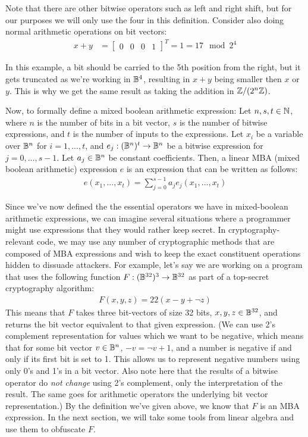 Note that there are other bitwise operators such as left and right shift, but for our
purposes we will only use the four in this definition. Consider also doing normal arithmetic operations on bit vectors:
\begin{align*}
x + y &= \begin{bmatrix}
0 & 0 & 0 & 1 
\end{bmatrix}^T = 1 = 17 \mod 2^4 
\end{align*}
\par In this example, a bit should be carried to
the 5th position from the right, but it gets truncated as we're working in $\mathbb{B}^4$, resulting
in $x + y$ being smaller then $x$ or $y$. 
This is why we get the same result as taking the addition in
$\mathbb{Z}/(2^n\mathbb{Z})$.
\par Now, to formally define a mixed boolean arithmetic expression:
 {Let $n,s,t \in \mathbb{N}$, where $n$ is the number of bits in a bit vector, 
$s$ is the number of bitwise expressions, and $t$ is the number of 
inputs to the expressions.
Let $x_i$ be a variable over $\mathbb{B}^n$ for
$i = 1,...,t$, and $e_j : (\mathbb{B}^n)^t \rightarrow \mathbb{B}^n$ be a bitwise expression for
$j = 0,...,s-1$. Let $a_j\in \mathbb{B}^n$ be constant coefficients.
Then, a linear MBA (mixed boolean arithmetic) expression $e$ is an expression that can be written as follows:
\begin{align*}
    e(x_1, ..., x_t) = \sum_{j=0}^{s-1} a_j e_j(x_1,...,x_t)
\end{align*}
}
\par Since we've now defined the the essential operators we have in mixed-boolean 
arithmetic
expressions, we can imagine several situations where a programmer might use expressions 
that they would rather keep secret. In cryptography-relevant code, we may use any
number of cryptographic methods that are composed of MBA 
expressions
and wish to keep the exact constituent operations hidden 
to dissuade attackers. For example, let's say we are working on a 
program that uses the following function $F : (\mathbb{B}^{32})^3 \rightarrow \mathbb{B}^{32}$ as part
of a top-secret cryptography algorithm:
\begin{align*}
    F(x, y, z) = 22(x - y + \neg z)
\end{align*}
This means  that $F$ takes three bit-vectors of size 32 bits, $x, y, z \in \mathbb{B}^{32}$, 
and returns the bit vector equivalent to that given expression. 
(We can use 2's complement representation for values which we want to be negative,
which means that for some bit vector $v \in \mathbb{B}^n$, $-v = \neg v + 1$,
and a number is negative if and only if its first bit is set to 1.
This allows us to represent negative numbers using only 0's and 1's in a bit vector. 
Also note here that the results of a bitwise operator do {\itshape not change} 
using 2's complement, only the  interpretation of the result. The same goes for 
arithmetic operators the underlying bit vector representation.)
By the definition we've given above, we know that $F$ is an MBA expression. 
In the next section, 
we will take some tools from linear algebra and use them to obfuscate $F$.
